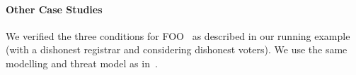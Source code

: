 


\paragraph{\bf Other Case Studies}
\label{sec:caseStudies:others}
We verified the three conditions for FOO~\cite{fujioka1992practical} as described in our running example
(with a dishonest registrar and considering dishonest voters).
We use the same modelling and threat model as in~\cite{vote-CSF16}.

